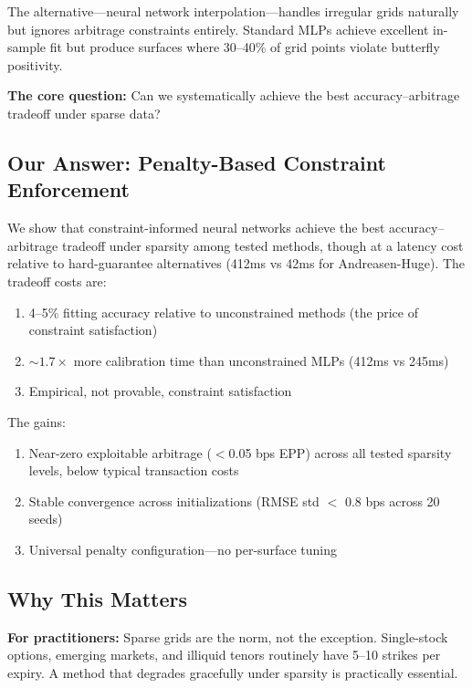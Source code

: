 \documentclass[11pt,a4paper]{article}
\begin{document}
The alternative---neural network interpolation---handles irregular grids naturally but ignores arbitrage constraints entirely. Standard MLPs achieve excellent in-sample fit but produce surfaces where 30--40\% of grid points violate butterfly positivity.

\textbf{The core question:} Can we systematically achieve the best accuracy--arbitrage tradeoff under sparse data?

\subsection{Our Answer: Penalty-Based Constraint Enforcement}

We show that constraint-informed neural networks achieve the best accuracy--arbitrage tradeoff under sparsity among tested methods, though at a latency cost relative to hard-guarantee alternatives (412ms vs 42ms for Andreasen-Huge). The tradeoff costs are:

\begin{enumerate}
    \item 4--5\% fitting accuracy relative to unconstrained methods (the price of constraint satisfaction)
    \item ${\sim}1.7\times$ more calibration time than unconstrained MLPs (412ms vs 245ms)
    \item Empirical, not provable, constraint satisfaction
\end{enumerate}

The gains:
\begin{enumerate}
    \item Near-zero exploitable arbitrage ($<$0.05 bps EPP) across all tested sparsity levels, below typical transaction costs
    \item Stable convergence across initializations (RMSE std $<$ 0.8 bps across 20 seeds)
    \item Universal penalty configuration---no per-surface tuning
\end{enumerate}

\subsection{Why This Matters}

\textbf{For practitioners:} Sparse grids are the norm, not the exception. Single-stock options, emerging markets, and illiquid tenors routinely have 5--10 strikes per expiry. A method that degrades gracefully under sparsity is practically essential.
\end{document}
